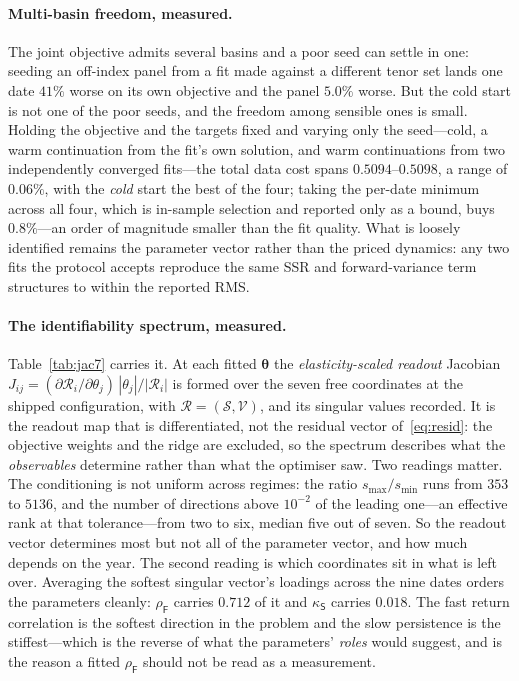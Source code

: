 \documentclass[11pt]{article}
\providecommand{\Rcal}{\mathcal R}
\providecommand{\1}{\mathbf 1}
\newcommand{\bth}{{\boldsymbol{\theta}}}
\begin{document}
\paragraph{Multi-basin freedom, measured.} The joint objective admits several basins and a poor seed
can settle in one: seeding an off-index panel from a fit made against a different tenor set lands one
date $41\%$ worse on its own objective and the panel $5.0\%$ worse. But the cold start is not one of
the poor seeds, and the freedom among sensible ones is small. Holding the objective and the targets
fixed and varying only the seed---cold, a warm continuation from the fit's own solution, and warm
continuations from two independently converged fits---the total data cost spans
$0.5094$--$0.5098$, a range of $0.06\%$, with the \emph{cold} start the best of the four; taking the
per-date minimum across all four, which is in-sample selection and reported only as a bound, buys
$0.8\%$---an order of magnitude smaller than the fit quality. What is loosely identified remains the parameter vector rather than the priced
dynamics: any two fits the protocol accepts reproduce the same SSR and forward-variance term
structures to within the reported RMS.

\paragraph{The identifiability spectrum, measured.} Table~\ref{tab:jac7} carries it. At each fitted
$\bth$ the \emph{elasticity-scaled readout} Jacobian
$J_{ij}=(\partial\Rcal_i/\partial\theta_j)\,|\theta_j|/|\Rcal_i|$ is formed over the seven free
coordinates at the shipped configuration, with $\Rcal=(\mathcal S,\mathcal V)$, and its singular
values recorded. It is the readout map that is differentiated, not the residual vector
of~\eqref{eq:resid}: the objective weights and the ridge are excluded, so the spectrum describes
what the \emph{observables} determine rather than what the optimiser saw. Two readings matter. The conditioning is not uniform across regimes: the
ratio $s_{\max}/s_{\min}$ runs from $353$ to $5136$, and the number of directions above $10^{-2}$ of
the leading one---an effective rank at that tolerance---from two to six, median five out of seven.
So the readout vector determines most but not all of the parameter vector, and how much depends on
the year. The second reading is which coordinates sit in what is left over. Averaging the softest
singular vector's loadings across the nine dates orders the parameters cleanly: $\rho_{\mathsf F}$
carries $0.712$ of it and $\kappa_{\mathsf S}$ carries $0.018$. The fast return correlation is the
softest direction in the problem and the slow persistence is the stiffest---which is the reverse of
what the parameters' \emph{roles} would suggest, and is the reason a fitted $\rho_{\mathsf F}$
should not be read as a measurement.
\end{document}
